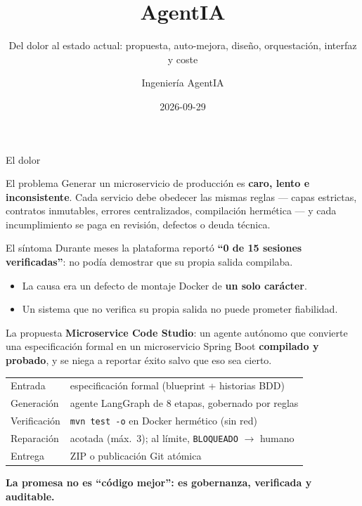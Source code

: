 \documentclass[aspectratio=169,11pt]{beamer}
\title{AgentIA}
\subtitle{Del dolor al estado actual: propuesta, auto-mejora, diseño, orquestación, interfaz y coste}
\author{Ingeniería AgentIA}
\date{2026-09-29}
\begin{document}
\begin{frame}
  \titlepage
\end{frame}

\begin{frame}{El dolor}
  \begin{block}{El problema}
    Generar un microservicio de producción es \textbf{caro, lento e inconsistente}.
    Cada servicio debe obedecer las mismas reglas --- capas estrictas, contratos
    inmutables, errores centralizados, compilación hermética --- y cada incumplimiento
    se paga en revisión, defectos o deuda técnica.
  \end{block}
  \begin{alertblock}{El síntoma}
    Durante meses la plataforma reportó \textbf{``0 de 15 sesiones verificadas''}:
    no podía demostrar que su propia salida compilaba.
  \end{alertblock}
  \begin{itemize}
    \item La causa era un defecto de montaje Docker de \textbf{un solo carácter}.
    \item Un sistema que no verifica su propia salida no puede prometer fiabilidad.
  \end{itemize}
\end{frame}

\begin{frame}{La propuesta}
  \textbf{Microservice Code Studio}: un agente autónomo que convierte una
  especificación formal en un microservicio Spring Boot \textbf{compilado y probado},
  y se niega a reportar éxito salvo que eso sea cierto.
  \begin{center}
    \begin{tabular}{ll}
      \toprule
      Entrada & especificación formal (blueprint + historias BDD) \\
      Generación & agente LangGraph de 8 etapas, gobernado por reglas \\
      Verificación & \texttt{mvn test -o} en Docker hermético (sin red) \\
      Reparación & acotada (máx.\ 3); al límite, \texttt{BLOQUEADO} $\rightarrow$ humano \\
      Entrega & ZIP o publicación Git atómica \\
      \bottomrule
    \end{tabular}
  \end{center}
  \textbf{La promesa no es ``código mejor'': es gobernanza, verificada y auditable.}
\end{frame}
\end{document}
